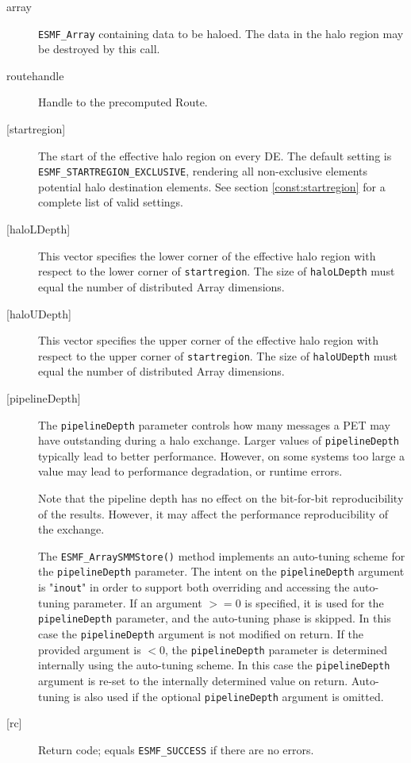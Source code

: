      \begin{description}
     \item [array]
       {\tt ESMF\_Array} containing data to be haloed. The data in the halo
       region may be destroyed by this call.
     \item [routehandle]
       Handle to the precomputed Route.
     \item [{[startregion]}]
       \begin{sloppypar}
       The start of the effective halo region on every DE. The default
       setting is {\tt ESMF\_STARTREGION\_EXCLUSIVE}, rendering all non-exclusive
       elements potential halo destination elements.
       See section \ref{const:startregion} for a complete list of
       valid settings.
       \end{sloppypar}
     \item[{[haloLDepth]}] 
       This vector specifies the lower corner of the effective halo
       region with respect to the lower corner of {\tt startregion}.
       The size of {\tt haloLDepth} must equal the number of distributed Array
       dimensions.
     \item[{[haloUDepth]}] 
       This vector specifies the upper corner of the effective halo
       region with respect to the upper corner of {\tt startregion}.
       The size of {\tt haloUDepth} must equal the number of distributed Array
       dimensions.
     \item [{[pipelineDepth]}]
       The {\tt pipelineDepth} parameter controls how many messages a PET
       may have outstanding during a halo exchange. Larger values
       of {\tt pipelineDepth} typically lead to better performance. However,
       on some systems too large a value may lead to performance degradation,
       or runtime errors.
  
       Note that the pipeline depth has no effect on the bit-for-bit
       reproducibility of the results. However, it may affect the performance
       reproducibility of the exchange.
  
       The {\tt ESMF\_ArraySMMStore()} method implements an auto-tuning scheme
       for the {\tt pipelineDepth} parameter. The intent on the 
       {\tt pipelineDepth} argument is "{\tt inout}" in order to 
       support both overriding and accessing the auto-tuning parameter.
       If an argument $>= 0$ is specified, it is used for the 
       {\tt pipelineDepth} parameter, and the auto-tuning phase is skipped.
       In this case the {\tt pipelineDepth} argument is not modified on
       return. If the provided argument is $< 0$, the {\tt pipelineDepth}
       parameter is determined internally using the auto-tuning scheme. In this
       case the {\tt pipelineDepth} argument is re-set to the internally
       determined value on return. Auto-tuning is also used if the optional 
       {\tt pipelineDepth} argument is omitted.
  
     \item [{[rc]}]
       Return code; equals {\tt ESMF\_SUCCESS} if there are no errors.
     \end{description}
   
